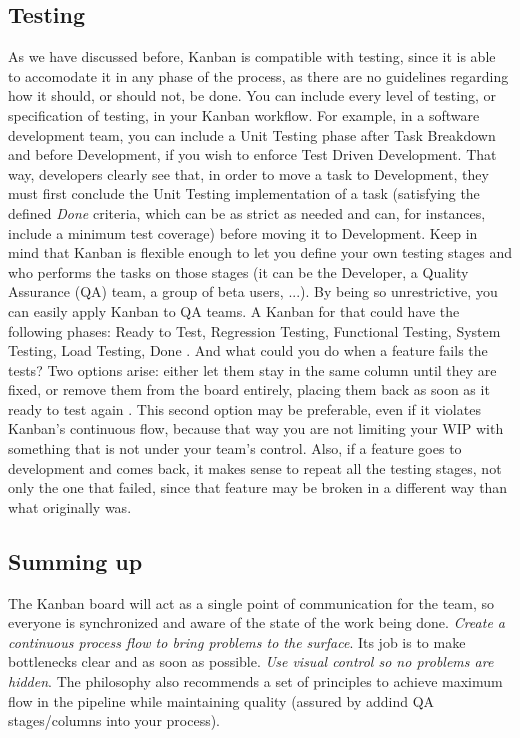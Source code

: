\documentclass[conference]{IEEEtran}
\begin{document}
\subsection{Testing}
As we have discussed before, Kanban is compatible with testing, since it is able to
accomodate it in any phase of the process, as there are no guidelines regarding how it should, or should not, be done.
You can include every level of testing, or specification of testing, in your Kanban
workflow.
For example, in a software development team, you can include a Unit Testing phase
after Task Breakdown and before Development, if you wish to enforce Test Driven Development.
That way, developers clearly see that, in order to move a task to Development, they must
first conclude the Unit Testing implementation of a task (satisfying the defined \textit{Done}
criteria, which can be as strict as needed and can, for instances, include a minimum
test coverage) before moving it to Development.
Keep in mind that Kanban is flexible enough to let you define your own testing stages and
who performs the tasks on those stages (it can be the Developer, a Quality Assurance (QA) team, a
group of beta users, ...).
By being so unrestrictive, you can easily apply Kanban to QA teams. A Kanban for that
could have the following phases: Ready to Test, Regression Testing, Functional Testing,
System Testing, Load Testing, Done \cite{qakanban}. And what could you do when
a feature fails the tests? Two options arise: either let them stay in the same
column until they are fixed, or remove them from the board entirely, placing
them back as soon as it ready to test again \cite{qakanban}. This second option may be
preferable, even if it violates Kanban's continuous flow, because that way you are not
limiting your WIP with something that is not under your team's control. Also,
if a feature goes to development and comes back, it makes sense to repeat all the testing
stages, not only the one that failed, since that feature may be broken in a different way
than what originally was.

\subsection{Summing up} %
The Kanban board will act as a single point of communication for the
team, so everyone is synchronized and aware of the state of the work being done.
\textit{Create a continuous process flow to bring problems to the surface}.
Its job is to make bottlenecks clear and as soon as possible. \textit{Use visual control so no problems are hidden}.
The philosophy also recommends a set of principles to achieve maximum flow in the
pipeline while maintaining quality (assured by addind QA stages/columns into your process).
\end{document}
